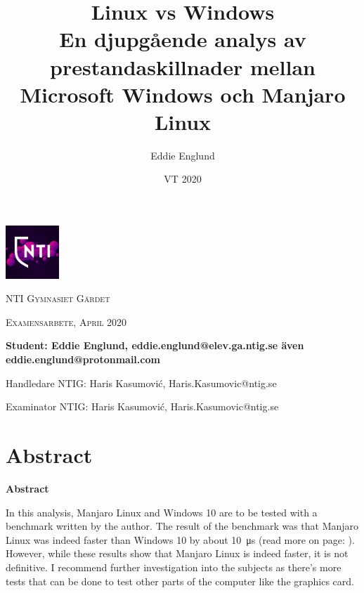\documentclass[12pt, a4paper]{report}
\author{Eddie Englund}
\title{Linux vs Windows\\[0.2em]\smaller{}En djupgående analys av prestandaskillnader mellan Microsoft Windows och Manjaro Linux}
\date{VT 2020}
\makeatletter
\renewcommand*{\abstractname}{Abstract}
\renewenvironment{abstract}{%
    \if@twocolumn
    \renewcommand*{\abstractname}{Abstract}

      \section*{\abstractname}%
    \else %
      \begin{flushleft}%
        \renewcommand*{\abstractname}{Abstract}

        {\bfseries \Large\abstractname\vspace{\z@}}%
      \end{flushleft}%
      \quotation
    \fi}
    {\if@twocolumn\else\endquotation\fi}
\makeatother
\begin{document}
\begin{titlepage}
    \maketitle

    \begin{center}
        \thispagestyle{empty}
    
        \includegraphics[width=0.15\textwidth]{nti.png}\par\vspace{1cm}

    {\scshape\LARGE NTI Gymnasiet Gärdet \par}
    \vspace{1cm}
    {\scshape\Large Examensarbete, April 2020\par}
	\vspace{1.5cm}
    \textbf{
    Student: Eddie Englund, eddie.englund@elev.ga.ntig.se även eddie.englund@protonmail.com}
    \vspace{0.2cm}

    Handledare NTIG: Haris Kasumović, Haris.Kasumovic@ntig.se
    \vspace{0.1cm}

    Examinator NTIG: Haris Kasumović, Haris.Kasumovic@ntig.se
    
    \end{center}
\end{titlepage}

\setlength{\cftbeforetoctitleskip}{-3em}
\tableofcontents

\vspace{2cm}
\begin{abstract}
In this analysis, Manjaro Linux and Windows 10 are to be tested with a benchmark written by the author. The result of the benchmark was that Manjaro Linux was indeed faster than Windows 10 by about \SI{10}{\us} (read more on page: \pageref{tests}). However, while these results show that Manjaro Linux is indeed faster, it is not definitive. I recommend further investigation into the subjects as there's more tests that can be done to test other parts of the computer like the graphics card.

\end{abstract}
\end{document}
